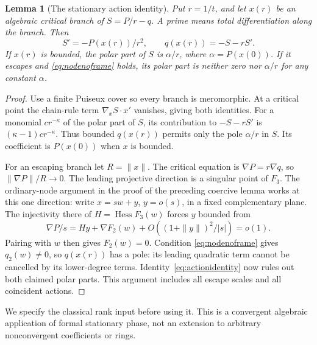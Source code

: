 \documentclass[11pt]{article}
\newtheorem{lemma}[theorem]{Lemma}
\theoremstyle{definition}\newtheorem{definition}[theorem]{Definition}
\theoremstyle{remark}\newtheorem{remark}[theorem]{Remark}
\begin{document}
\begin{lemma}[The stationary action identity]\label{lem:actionidentity}
Put $r=1/t$, and let $x(r)$ be an algebraic critical branch of
$S=P/r-q$. A prime means total differentiation along the branch.
Then
\begin{equation}\label{eq:actionidentity}
 S'=-P(x(r))/r^2,\qquad q(x(r))=-S-rS'.
\end{equation}
If $x(r)$ is bounded, the polar part of $S$ is $\alpha/r$, where
$\alpha=P(x(0))$. If it escapes and \eqref{eq:nodenoframe} holds,
its polar part is neither zero nor $\alpha/r$ for any constant
$\alpha$.
\end{lemma}
\begin{proof}
Use a finite Puiseux cover so every branch is meromorphic. At a
critical point the chain-rule term $\nabla_x S\cdot x'$ vanishes,
giving both identities. For a monomial $c r^{-\kappa}$ of the
polar part of $S$, its contribution to $-S-rS'$ is
$(\kappa-1)c r^{-\kappa}$. Thus bounded $q(x(r))$ permits only
the pole $\alpha/r$ in $S$. Its coefficient is $P(x(0))$ when
$x$ is bounded.

For an escaping branch let $R=\|x\|$. The critical equation is
$\nabla P=r\nabla q$, so $\|\nabla P\|/R\longrightarrow0$.
The leading projective direction is a singular point of $F_3$.
The ordinary-node argument in the proof of the preceding coercive
lemma works at this one direction: write $x=sw+y$, $y=o(s)$,
in a fixed complementary plane. The injectivity there of
$H=\operatorname{Hess}F_3(w)$ forces $y$ bounded from
\[
 \nabla P/s=Hy+\nabla F_2(w)+O((1+\|y\|)^2/|s|)=o(1).
\]
Pairing with $w$ then gives $F_2(w)=0$. Condition
\eqref{eq:nodenoframe} gives $q_2(w)\ne0$, so $q(x(r))$ has a
pole: its leading quadratic term cannot be cancelled by its
lower-degree terms. Identity~\eqref{eq:actionidentity} now rules
out both claimed polar parts. This argument includes all escape
scales and all coincident actions.
\end{proof}

We specify the classical rank input before using it. This is a
convergent algebraic application of formal stationary phase, not
an extension to arbitrary nonconvergent coefficients or rings.
\end{document}

